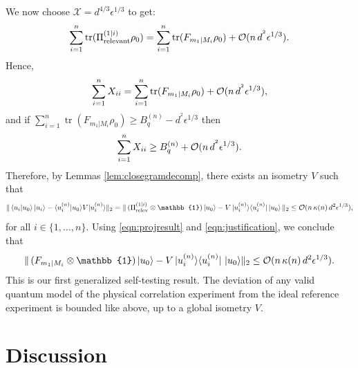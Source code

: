 We now choose $\mathcal{X}=d^{4/3}\epsilon^{1/3}$ to get:
\begin{equation*}
\sum_{i=1}^n\operatorname{tr}(\Pi_{\text{relevant}}^{(1\vert i)}\rho_0) = \sum_{i=1}^n\operatorname{tr}(F_{m_1\vert M_i}\rho_0)+\mathcal{O}(n\thinspace d^{^2}\epsilon^{1/3}).
\end{equation*}
Hence,
\begin{equation*}
\sum_{i=1}^n X_{ii} = \sum_{i=1}^n\operatorname{tr}(F_{m_1\vert M_i}\rho_0)+\mathcal{O}(n\thinspace d^{^2}\epsilon^{1/3}),
\end{equation*}
and if $\sum_{i=1}^n \operatorname{tr}(F_{m_1\vert M_i}\rho_0)\geq B_q^{(n)}-d^{^2}\epsilon^{1/3}$ then
\begin{equation*}
\sum_{i=1}^n X_{ii} \geq B_q^{(n)}+\mathcal{O}(n \thinspace d^{^2}\epsilon^{1/3}).
\end{equation*}
Therefore, by Lemmas \ref{lem:closegramdecomp}, there exists an isometry $V$ such that
\begin{equation*}
\|\bra{u_i}\ket{u_0}\ket{u_i}-\langle u_i^{(n)}\vert u_0\rangle V \vert u_i^{(n)} \rangle \|_2 = \|\thinspace(\Pi_{\text{relev}}^{(1\vert i)}\otimes \mathbb{1})\ket{u_0}-V\thinspace\vert u_i^{(n)}\rangle \langle u_i^{(n)} \vert\thinspace\vert u_0 \rangle \thinspace\|_2 \leq \mathcal{O}(n\thinspace\kappa(n)\thinspace d^2\epsilon^{1/3}),
\end{equation*}
for all $i \in \{1,\dots,n\}$.
Using \ref{eqn:projresult} and \ref{eqn:justification}, we conclude that
\begin{equation*}
\|\thinspace (F_{m_1\vert M_i}\otimes \mathbb{1})\ket{u_0}-V \thinspace\vert u_i^{(n)}\rangle \langle u_i^{(n)} \vert\thinspace\thinspace \vert u_0 \rangle \|_2 \leq \mathcal{O}(n\thinspace\kappa(n) \thinspace d^2\epsilon^{1/3}).
\end{equation*}
This is our first generalized self-testing result. The deviation of any valid quantum model of the physical correlation experiment from the ideal reference experiment is bounded like above, up to a global isometry $V$.



\section{Discussion}
\label{sec:discussion}